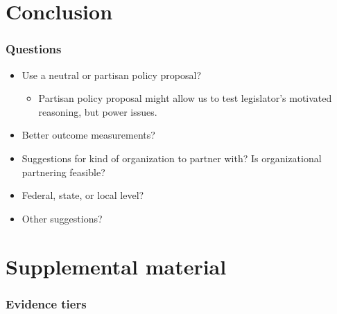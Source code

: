 \documentclass[usenames,dvipsnames]{beamer}
\begin{document}

\section{Conclusion}

\begin{frame}
\frametitle{Questions}
\begin{itemize}
\item Use a \textcolor{Cerulean}{neutral or partisan policy} proposal?
\begin{itemize}
\item Partisan policy proposal might allow us to test legislator's motivated reasoning, but power issues.
\end{itemize}
\item Better \textcolor{Cerulean}{outcome measurements}?
\item Suggestions for kind of \textcolor{Cerulean}{organization to partner with}? Is organizational partnering feasible?
\item Federal, state, or local level?
\item Other suggestions?
\end{itemize}

\end{frame}


\appendix

\section{Supplemental material}

\begin{frame}[label= doe_evidence]
\frametitle{Evidence tiers}


\end{frame}
\end{document}
